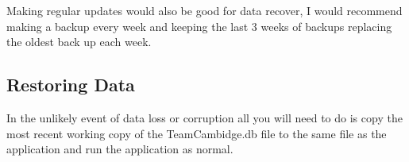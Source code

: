 Making regular updates would also be good for data recover, I would recommend making a backup every week and keeping the last 3 weeks of backups replacing the oldest back up each week. 
\subsection{Restoring Data}
In the unlikely event of data loss or corruption all you will need to do is copy the most recent working copy of the TeamCambidge.db file to the same file as the application and run the application as normal.

\stopcontents[UserManual] 

